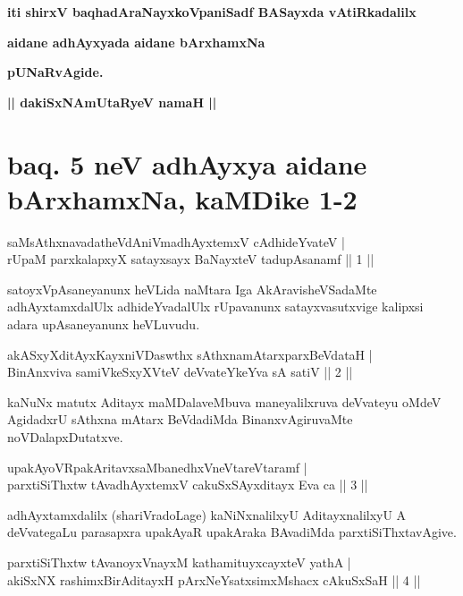 \begin{center}
{\bf iti shirxV baqhadAraNayxkoVpaniSadf BASayxda vAtiRkadalilx}
\smallskip

{\bf aidane adhAyxyada aidane bArxhamxNa}
\smallskip

{\bf pUNaRvAgide.}

\smallskip
{\bf || dakiSxNAmUtaRyeV namaH ||}
\end{center}

\section*{baq. 5 neV adhAyxya aidane bArxhamxNa, kaMDike 1-2}

\begin{shl}
saMsAthxnavadatheVdAniVmadhAyxtemxV cAdhideYvateV | \\
rUpaM parxkalapxyX satayxsayx BaNayxteV  tadupAsanamf \hfill ||  1 || 
\end{shl}

\begin{artha}
satoyxVpAsaneyanunx heVLida naMtara Iga AkAravisheVSadaMte adhAyxtamxdalUlx adhideYvadalUlx rUpavanunx satayxvasutxvige kalipxsi adara upAsaneyanunx heVLuvudu.
\end{artha}

\begin{shl}
akASxyXditAyxKayxniVDaswthx sAthxnamAtarxparxBeVdataH | \\
BinAnxviva samiVkeSxyXVteV deVvateYkeYva sA satiV \hfill ||  2 || 
\end{shl}

\begin{artha}
kaNuNx matutx Aditayx maMDalaveMbuva maneyalilxruva deVvateyu oMdeV AgidadxrU sAthxna mAtarx BeVdadiMda BinanxvAgiruvaMte noVDalapxDutatxve.
\end{artha}

\begin{shl}
upakAyoVRpakAritavxsaMbanedhxVneVtareVtaramf | \\
parxtiSiThxtw tAvadhAyxtemxV cakuSxSAyxditayx Eva ca \hfill ||  3 || 
\end{shl}

\begin{artha}
adhAyxtamxdalilx (shariVradoLage) kaNiNxnalilxyU AditayxnalilxyU A deVvategaLu parasapxra upakAyaR upakAraka BAvadiMda parxtiSiThxtavAgive.
\end{artha}

\begin{shl}
parxtiSiThxtw tAvanoyxVnayxM kathamituyxcayxteV yathA  | \\
akiSxNX rashimxBirAditayxH pArxNeYsatxsimxMshacx cAkuSxSaH \hfill ||  4 || 
\end{shl}

